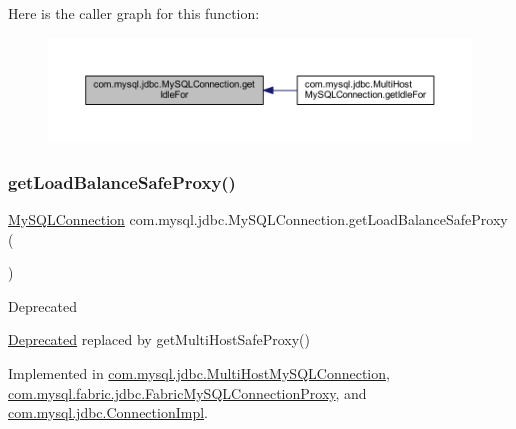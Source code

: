 Here is the caller graph for this function\+:
\nopagebreak
\begin{figure}[H]
\begin{center}
\leavevmode
\includegraphics[width=350pt]{interfacecom_1_1mysql_1_1jdbc_1_1_my_s_q_l_connection_a835df16f7b2e35f0729ba560fd210a2a_icgraph}
\end{center}
\end{figure}
\mbox{\label{interfacecom_1_1mysql_1_1jdbc_1_1_my_s_q_l_connection_aefbe0aa8c5652ee9534dd5354c8af220}} 
\subsubsection{\texorpdfstring{get\+Load\+Balance\+Safe\+Proxy()}{getLoadBalanceSafeProxy()}}
{\footnotesize\ttfamily \mbox{\hyperlink{interfacecom_1_1mysql_1_1jdbc_1_1_my_s_q_l_connection}{My\+S\+Q\+L\+Connection}} com.\+mysql.\+jdbc.\+My\+S\+Q\+L\+Connection.\+get\+Load\+Balance\+Safe\+Proxy (\begin{DoxyParamCaption}{ }\end{DoxyParamCaption})}

\begin{DoxyRefDesc}{Deprecated}
\item[\mbox{\hyperlink{deprecated__deprecated000016}{Deprecated}}]replaced by {\ttfamily get\+Multi\+Host\+Safe\+Proxy()} \end{DoxyRefDesc}


Implemented in \mbox{\hyperlink{classcom_1_1mysql_1_1jdbc_1_1_multi_host_my_s_q_l_connection_ad7893fe96d0aaafec04050c268d5fb44}{com.\+mysql.\+jdbc.\+Multi\+Host\+My\+S\+Q\+L\+Connection}}, \mbox{\hyperlink{classcom_1_1mysql_1_1fabric_1_1jdbc_1_1_fabric_my_s_q_l_connection_proxy_afb882b6df0430c4a690b828c9eb85244}{com.\+mysql.\+fabric.\+jdbc.\+Fabric\+My\+S\+Q\+L\+Connection\+Proxy}}, and \mbox{\hyperlink{classcom_1_1mysql_1_1jdbc_1_1_connection_impl_ae9ce7aa6699cd62451e72acd02f46a42}{com.\+mysql.\+jdbc.\+Connection\+Impl}}.

